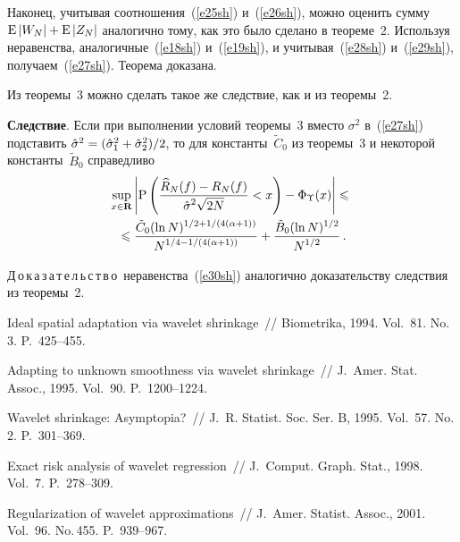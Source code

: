 \begin{multicols}{2}
Наконец, учитывая соотношения~(\ref{e25sh}) и~(\ref{e26sh}), можно оценить сумму 
$\mbox{E}\abs{W_N}\hm+\mbox{E}\abs{Z_N}$ аналогично тому, как 
это было сделано в тео\-ре\-ме~2. Используя неравенства, аналогичные~(\ref{e18sh}) и~(\ref{e19sh}),
 и учитывая~(\ref{e28sh}) и~(\ref{e29sh}), получаем~(\ref{e27sh}). Теорема доказана.
 
 \medskip

Из теоремы~3 можно сделать такое же следствие, как и из теоремы~2.

\medskip

\noindent
\textbf{Следствие}. Если при выполнении условий теоремы~3 
вместо $\sigma^2$ в~(\ref{e27sh}) 
подставить $\hat{\sigma}^2\hm=(\hat{\sigma}_1^2\hm+\hat{\sigma}_2^2)/2$, то для 
константы~$\tilde{C}_0$ из теоремы~3 и некоторой константы~$\tilde{B}_0$ справедливо
\begin{multline}
\sup\limits_{x\in\mathbf{R}}\left\vert\mbox{P}\left(
\displaystyle\frac{\displaystyle \widehat{R}_N(f)-R_N(f)\mathstrut}{\displaystyle \hat{\sigma}^2\sqrt{2N}\mathstrut}<x\right)-
\Phi_{\Upsilon}(x)\right\vert\leqslant{}\\
{}\leqslant
\displaystyle\frac{\displaystyle \tilde{C}_0(\ln N)^{{1}/{2}+{1}/(4(\alpha+1))}\mathstrut}{\displaystyle N^{{1}/{4}-{1}/(4(\alpha+1))}\mathstrut}+\displaystyle\frac{\displaystyle \tilde{B}_0(\ln N)^{{1}/{2}}\mathstrut}{\displaystyle N^{{1}/{2}}\mathstrut}\,.\label{e30sh}
\end{multline}

\noindent
Д\,о\,к\,а\,з\,а\,т\,е\,л\,ь\,с\,т\,в\,о\ неравенства~(\ref{e30sh}) аналогично доказательству следствия из теоремы~2.


{\small\frenchspacing
{%
\begin{thebibliography}{99}

 Ideal spatial adaptation via
wavelet shrinkage~// Biometrika, 1994. Vol.~81. No.\,3. P.~425--455.


 Adapting to unknown
smoothness via wavelet shrinkage~// J.~Amer. Stat. Assoc., 1995.
Vol.~90. P.~1200--1224.


Wavelet shrinkage: Asymp\-to\-pia?~// J.~R. Statist. Soc. Ser. B,
1995. Vol.~57. No.\,2. P.~301--369.

 Exact risk analysis of wavelet regression~// J.~Comput.
Graph. Stat., 1998. Vol.~7. P.~278--309.

 Regularization of wavelet approximations~// 
J.~Amer. Statist. Assoc., 2001. Vol.~96. No.\,455. P.~939--967.


\end{thebibliography}}}
\end{multicols}
